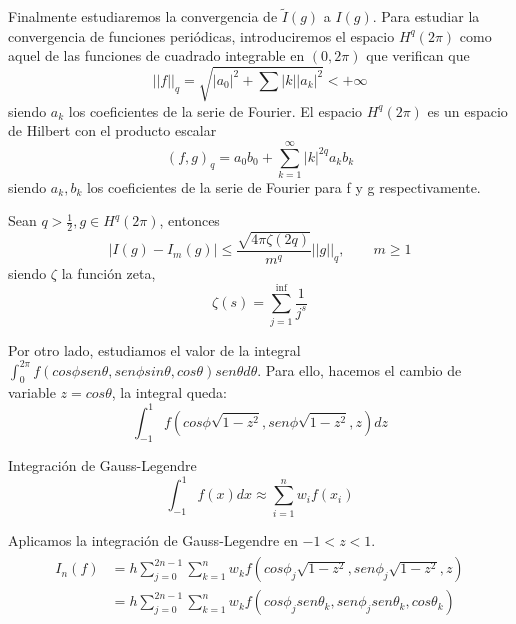 Finalmente estudiaremos la convergencia de $\widetilde{I}(g)$ a $I(g)$. Para estudiar la convergencia de funciones periódicas, introduciremos el espacio $H^q(2\pi)$ como aquel de las funciones de cuadrado integrable en $(0,2\pi)$ que verifican que 
$$
||f||_q = \sqrt{|a_0|^2+\sum_{}^{}|k||a_k|^2} < +\infty
$$
siendo $a_k$ los coeficientes de la serie de Fourier.
El espacio $H^q(2\pi)$ es un espacio de Hilbert con el producto escalar 
$$ (f,g)_q = a_0b_0 + \sum_{k=1}^{\infty}|k|^{2q} a_kb_k $$ siendo $a_k,b_k$ los coeficientes de la serie de Fourier para f y g respectivamente. 

\begin{thm}Sean $q > \frac{1}{2}, g\in H^q(2\pi)$, entonces
	$$
	| I(g) - I_m(g) | \le \frac{\sqrt{4\pi\zeta(2q)}}{m^q} ||g||_q, \qquad m\ge 1
	$$  
	siendo $\zeta$ la función zeta,
	$$\zeta(s) = \sum_{j=1}^{\inf} \frac{1}{j^s}$$
\end{thm}

Por otro lado, estudiamos el valor de la integral $\int_{0}^{2\pi} f(cos\phi sen\theta,sen\phi sin\theta,cos\theta)sen\theta d\theta$. Para ello, hacemos el cambio de variable $z= cos\theta$, la integral queda:
$$
\int_{-1}^{1} f(cos\phi\sqrt{1-z^2},sen \phi\sqrt{1-z^2},z) dz 
$$
\begin{rem}Integración de Gauss-Legendre
	$$
	\int_{-1}^{1}f(x)dx \approx \sum_{i=1}^{n} w_if(x_i)
	$$
\end{rem}
Aplicamos la integración de Gauss-Legendre en $-1<z<1$.
\begin{gather}\label{gaussian_quadrature}
\begin{aligned}
I_n(f) &= h \sum_{j=0}^{2n-1} \sum_{k=1}^{n} w_k f(cos \phi_j\sqrt{1-z^2}, sen\phi_j\sqrt{1-z^2},z) \\ &= h \sum_{j=0}^{2n-1} \sum_{k=1}^{n} w_k f(cos \phi_jsen\theta_k, sen\phi_jsen\theta_k,cos\theta_k)
\end{aligned}
\end{gather}

